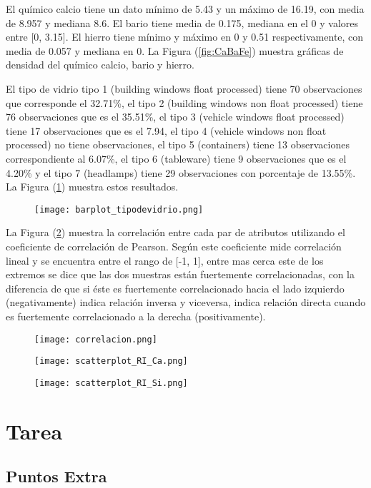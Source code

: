 El químico calcio tiene un dato mínimo de 5.43 y un máximo de 16.19, con media de 8.957 y mediana 8.6. El bario tiene media de 0.175, mediana en el 0 y valores entre [0, 3.15]. El hierro tiene mínimo y máximo en 0 y 0.51 respectivamente, con media de 0.057 y mediana en 0. La Figura (\ref{fig:CaBaFe}) muestra gráficas de densidad del químico calcio, bario y hierro.

El tipo de vidrio tipo 1 (building windows float processed) tiene 70 observaciones que corresponde el 32.71\%, el tipo 2 (building windows non float processed) tiene 76 observaciones que es el 35.51\%, el tipo 3 (vehicle windows float processed) tiene 17 observaciones que es el 7.94, el tipo 4 (vehicle windows non float processed) no tiene observaciones, el tipo 5 (containers) tiene 13 observaciones correspondiente al 6.07\%, el tipo 6 (tableware) tiene 9 observaciones que es el 4.20\% y el tipo 7 (headlamps) tiene 29 observaciones con porcentaje de 13.55\%. La Figura (\ref{fig:tipodevidrio}) muestra estos resultados.

\begin{figure}
	\centering
	\texttt{[image: barplot\_tipodevidrio.png]}
	\caption{} \label{fig:tipodevidrio}
\end{figure}

La Figura (\ref{fig:correlacion}) muestra la correlaci\'on entre cada par de atributos utilizando el coeficiente de correlaci\'on de Pearson. Seg\'un \citet{benesty} este coeficiente mide correlaci\'on lineal y se encuentra entre el rango de [-1, 1], entre mas cerca este de los extremos se dice que las dos muestras est\'an fuertemente correlacionadas, con la diferencia de que si \'este es fuertemente correlacionado hacia el lado izquierdo (negativamente) indica relaci\'on inversa y viceversa, indica relaci\'on directa cuando es fuertemente correlacionado a la derecha (positivamente).

\begin{figure}
	\centering
	\texttt{[image: correlacion.png]}
	\caption{} \label{fig:correlacion}
\end{figure}

\begin{figure}
	\centering
	\texttt{[image: scatterplot\_RI\_Ca.png]}
	\caption{} \label{fig:scatter_RICa}
\end{figure}

\begin{figure}
	\centering
	\texttt{[image: scatterplot\_RI\_Si.png]}
	\caption{} \label{fig:scatter_RISi}
\end{figure}

\section{Tarea} \label{sec:tarea}

\subsection{Puntos Extra}




